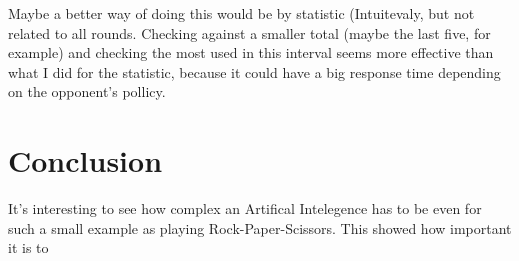 \documentclass[12pt]{article}
\begin{document}
Maybe a better way of doing this would be by statistic (Intuitevaly, but not related to all rounds. Checking against a smaller total (maybe the last five, for example) and checking the most used in this interval seems more effective than what I did for the statistic, because it could have a big response time depending on the opponent's pollicy.

\section{Conclusion}

It's interesting to see how complex an Artifical Intelegence has to be even for such a small example as playing Rock-Paper-Scissors. This showed how important it is to 
\end{document}
